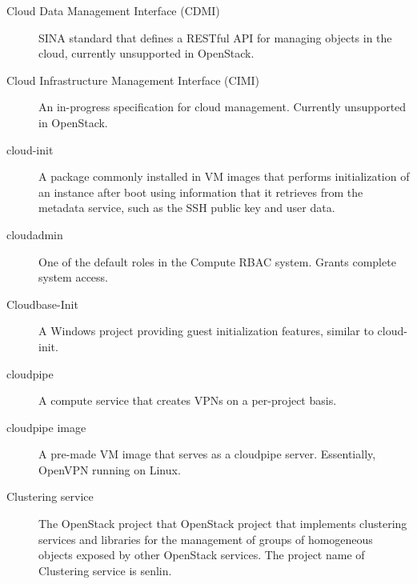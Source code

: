 \documentclass[letterpaper,10pt,english]{sphinxmanual}
\begin{document}
\begin{description}
\item[{Cloud Data Management Interface (CDMI)}] \leavevmode{}\label{_source/glossary:term-cloud-data-management-interface-cdmi}
SINA standard that defines a RESTful API for managing objects in
the cloud, currently unsupported in OpenStack.

\item[{Cloud Infrastructure Management Interface (CIMI)}] \leavevmode{}\label{_source/glossary:term-cloud-infrastructure-management-interface-cimi}
An in-progress specification for cloud management. Currently
unsupported in OpenStack.

\item[{cloud-init}] \leavevmode{}\label{_source/glossary:term-cloud-init}
A package commonly installed in VM images that performs
initialization of an instance after boot using information that it
retrieves from the metadata service, such as the SSH public key and
user data.

\item[{cloudadmin}] \leavevmode{}\label{_source/glossary:term-cloudadmin}
One of the default roles in the Compute RBAC system. Grants
complete system access.

\item[{Cloudbase-Init}] \leavevmode{}\label{_source/glossary:term-cloudbase-init}
A Windows project providing guest initialization features,
similar to cloud-init.

\item[{cloudpipe}] \leavevmode{}\label{_source/glossary:term-cloudpipe}
A compute service that creates VPNs on a per-project
basis.

\item[{cloudpipe image}] \leavevmode{}\label{_source/glossary:term-cloudpipe-image}
A pre-made VM image that serves as a cloudpipe server.
Essentially, OpenVPN running on Linux.

\item[{Clustering service}] \leavevmode{}\label{_source/glossary:term-clustering-service}
The OpenStack project that OpenStack project that implements
clustering services and libraries for the management of
groups of homogeneous objects exposed by other OpenStack
services. The project name of Clustering service is
senlin.


\end{description}
\end{document}
